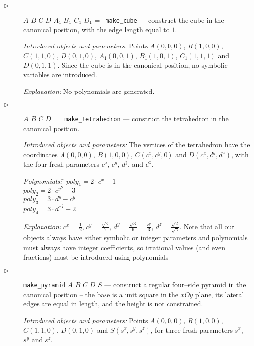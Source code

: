 \documentclass[final,1p,times,authoryear]{elsarticle}
\begin{document}
\begin{description}
\item[$\triangleright$] $A$ $B$ $C$ $D$ $A_1$ $B_1$ $C_1$ $D_1$ = {\tt
    make\_cube} --- construct the cube in the canonical position, with
  the edge length equal to $1$.

  {\em Introduced objects and parameters:} Points $A(0, 0, 0)$,
  $B(1, 0, 0)$, $C(1, 1, 0)$, $D(0, 1, 0)$, $A_1(0, 0, 1)$,
  $B_1(1, 0, 1)$, $C_1(1, 1, 1)$ and $D(0, 1, 1)$. Since the cube is
  in the canonical position, no symbolic variables are introduced.

  {\em Explanation:} No polynomials are generated.

\item[$\triangleright$] $A$ $B$ $C$ $D$ = {\tt
    make\_tetrahedron} \label{tetrahedron} --- construct the
  tetrahedron in the
  canonical position.

  {\em Introduced objects and parameters:} The vertices of the
  tetrahedron have the coordinates $A(0, 0, 0)$, $B(1, 0, 0)$,
  $C(c^x, c^y, 0)$ and $D(c^x, d^y, d^z)$, with the four fresh
  parameters $c^x$, $c^y$, $d^y$, and $d^z$.

\begin{tabbing}
{\em Polynomials:} \= $poly_1 = 2\cdot c^x - 1$ \\
                   \> $poly_2 = 2\cdot {c^y}^2 - 3$ \\
                   \> $poly_3 = 3\cdot d^y - c^y$ \\
                   \> $poly_4 = 3\cdot {d^z}^2 - 2$
\end{tabbing}

{\em Explanation:} $c^x = \frac{1}{2}$, $c^y = \frac{\sqrt{3}}{2}$,
$d^y = \frac{\sqrt{3}}{6} = \frac{c^y}{3}$,
$d^z = \frac{\sqrt{2}}{\sqrt{3}}$. Note that all our objects always
have either symbolic or integer parameters and polynomials must always
have integer coefficients, so irrational values (and even fractions)
must be introduced using polynomials.

\item[$\triangleright$] {\tt make\_pyramid} $A$ $B$ $C$ $D$ $S$ ---
  construct a regular four--side pyramid in the canonical position --
  the base is a unit square in the $xOy$ plane, its lateral edges are
  equal in length, and the height is not constrained.

  {\em Introduced objects and parameters:} Points $A(0, 0, 0)$,
  $B(1, 0, 0)$, $C(1, 1, 0)$, $D(0, 1, 0)$ and $S(s^x, s^y, s^z)$, for
  three fresh parameters $s^x$, $s^y$ and $s^z$.


\end{description}
\end{document}
